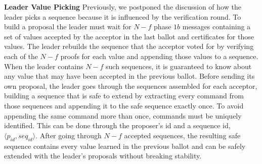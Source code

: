 \textbf{Leader Value Picking} Previously, we postponed the discussion of how the leader picks a sequence because it is influenced by the verification round. To build a proposal the leader must wait for $N-f$ phase $1b$ messages containing a set of values accepted by the acceptor in the last ballot and certificates for those values. The leader rebuilds the sequence that the acceptor voted for by verifying each of the $N-f$ proofs for each value and appending those values to a sequence. When the leader contains $N-f$ such sequences, it is guaranteed to know about any value that may have been accepted in the previous ballot. Before sending its own proposal, the leader goes through the sequences assembled for each acceptor, building a sequence that is safe to extend by extracting every command from those sequences and appending it to the safe sequence exactly once. To avoid appending the same command more than once, commands must be uniquely identified. This can be done through the proposer's id and a sequence id, $\langle p_{id}, seq_{id}\rangle$. After going through $N-f$ accepted sequences, the resulting safe sequence contains every value learned in the previous ballot and can be safely extended with the leader's proposals without breaking stability.
